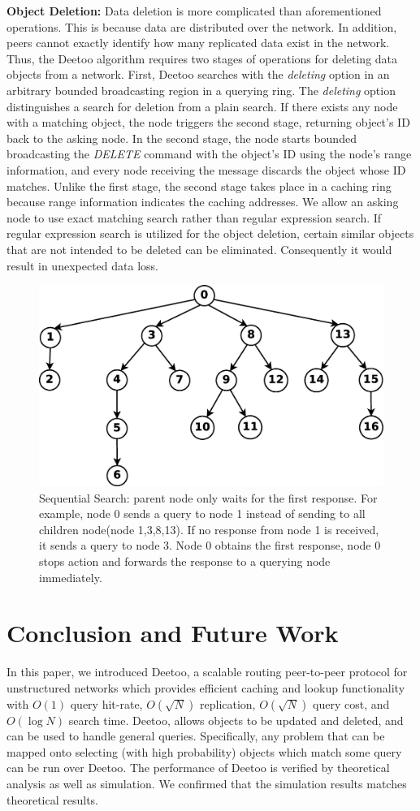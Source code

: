 \documentclass[9.5pt,journal,final,finalsubmission,twocolumn]{IEEEtran}
\begin{document}
\textbf{Object Deletion:} Data deletion is more complicated than aforementioned operations.
This is because data are distributed over the network. In addition, peers cannot exactly identify 
how many replicated data exist in the network.
Thus, the Deetoo algorithm requires two stages of operations for deleting data objects from a network. 
First, Deetoo searches with the \textit{deleting} option 
in an arbitrary bounded broadcasting region in a querying ring. The \textit{deleting} 
option distinguishes a search for deletion from a plain search.
If there exists any node with a matching object, the node triggers the second stage, returning 
object's ID back to the asking node. 
In the second stage, the node starts bounded broadcasting the \textit{DELETE} command with the object's ID using 
the node's range information, and every node receiving the message discards the object whose ID matches.
Unlike the first stage, the second stage takes place in a caching ring because range 
information indicates the caching addresses.
We allow an asking node to use exact matching search rather than regular expression search. 
If regular expression search is utilized for the object deletion, 
certain similar objects that are not intended to be deleted can be eliminated. 
Consequently it would result in unexpected data loss.

\begin{figure}
\centering
\includegraphics[width=3 in]{regextree}
\caption{Sequential Search: parent node only waits for the first response. For example, 
node 0 sends a query to node 1 instead of sending to all children node(node 1,3,8,13). 
If no response from node 1 is received, it sends a query to node 3. Node 0 obtains the first 
response, node 0 stops action and forwards the response to a querying node immediately.} 
\label{fig:regextree}
\end{figure}
\fi

\section{Conclusion and Future Work}
\label{sec:conclusion}
In this paper, we introduced Deetoo, a scalable routing peer-to-peer
protocol for unstructured networks which provides efficient caching
and lookup functionality with $O(1)$ query hit-rate, $O(\sqrt N)$
replication, $O(\sqrt{N})$ query cost, and $O(\log N)$ search time.
Deetoo, allows objects to be updated and deleted, and can
be used to handle general queries.  Specifically, any problem
that can be mapped onto selecting (with high probability) objects
which match some query can be run over Deetoo.
The performance of Deetoo is verified by theoretical analysis as well 
as simulation. We confirmed that the simulation results
matches theoretical results.
\end{document}
